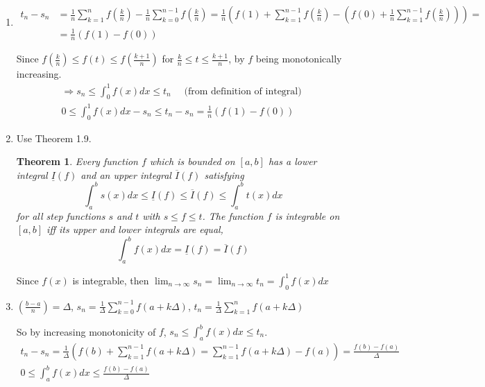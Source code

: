 \documentclass[twoside]{amsart}
\theoremstyle{plain}
\newtheorem{theorem}{Theorem}
\theoremstyle{definition}
\newcommand{\exercisehead}[1]
  {\smallskip
   \noindent{\small\bf Exercise #1.}}
\begin{document}
\exercisehead{34}
\begin{enumerate}
\item \[
\begin{aligned}
  t_n - s_n & = \frac{1}{n} \sum_{k=1}^n f\left( \frac{k}{n} \right) -  \frac{1}{n} \sum_{k=0}^{n-1} f\left( \frac{k}{n} \right) = \frac{1}{n} \left( f(1) +  \sum_{k=1}^{n-1} f\left( \frac{k}{n} \right) - \left( f(0)  +  \frac{1}{n} \sum_{k=1}^{n-1} f\left( \frac{k}{n} \right)  \right) \right)  = \\
  & = \frac{1}{n} (f(1)-f(0))
\end{aligned}
\]

Since $f\left( \frac{k}{n} \right) \leq f(t) \leq f\left( \frac{k+1}{n} \right)$ for $\frac{k}{n} \leq t \leq \frac{k+1}{n}$, by $f$ being monotonically increasing.  
\[
\begin{gathered}
  \Longrightarrow s_n \leq \int_0^1 f(x)dx \leq t_n \quad \text{ (from definition of integral) } \\
  0 \leq \int_0^1 f(x) dx -s_n \leq t_n - s_n = \frac{1}{n} (f(1) - f(0))
\end{gathered}
\]
\item Use Theorem 1.9.  
\begin{theorem}
Every function $f$ which is bounded on $[a,b]$ has a lower integral $\underline{I}(f)$ and an upper integral $\overline{I}(f)$ satisfying
\[
\int_a^b s(x) dx \leq \underline{I}(f) \leq \overline{I}(f) \leq \int_a^b t(x) dx 
\]
for all step functions $s$ and $t$ with $s\leq f \leq t$.  The function $f$ is integrable on $[a,b]$ iff its upper and lower integrals are equal,
\[
\int_a^b f(x) dx = \underline{I}(f) = \overline{I}(f)
\]
\end{theorem}
Since $f(x)$ is integrable, then $\lim_{n \to \infty} { s_n } = \lim_{n\to \infty} { t_n } = \int_0^1 f(x) dx $
\item $\left( \frac{ b-a}{n} \right) = \Delta$, $s_n = \frac{1}{ \Delta} \sum_{k=0}^{n-1} f(a+k\Delta)$, $t_n = \frac{1}{\Delta} \sum_{k=1}^n f(a+k\Delta)$

So by increasing monotonicity of $f$, $s_n \leq \int_a^b f(x) dx \leq t_n$.  
\[
\begin{gathered}
  t_n - s_n = \frac{1}{\Delta} \left( f(b) + \sum_{k=1}^{n-1} f(a+k\Delta) = \sum_{k=1}^{n-1} f(a+k\Delta) -f(a) \right) = \frac{ f(b)-f(a)}{\Delta} \\
  0 \leq \int_a^b f(x) dx \leq \frac{f(b) - f(a)}{\Delta}
\end{gathered}
\]
\end{enumerate}
\end{document}
